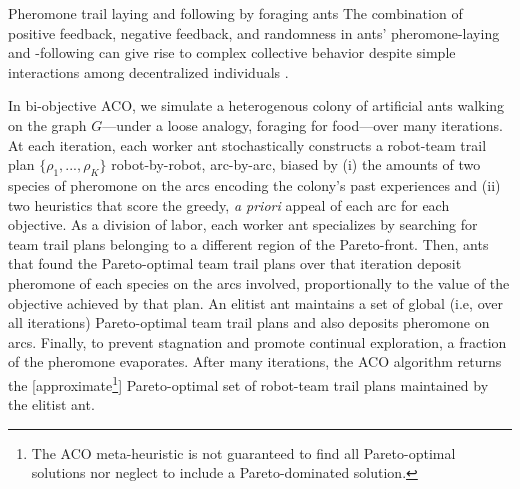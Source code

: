 \documentclass[11pt, oneside]{article}
\begin{document}
\begin{mybox}[label=box:ants, breakable]{Pheromone trail laying and following by foraging ants}
The combination of positive feedback, negative feedback, and randomness in ants' pheromone-laying and -following can give rise to complex collective behavior despite simple interactions among decentralized individuals \cite{bonabeau1997self,bonabeau1999swarm,goss1989self,jackson2006communication,edelstein1995trail,watmough1995modelling}.
\end{mybox}

In bi-objective ACO, we simulate a heterogenous colony of artificial ants walking on the graph $G$---under a loose analogy, foraging for food---over many iterations. 
At each iteration, each worker ant stochastically constructs a robot-team trail plan $\{\rho_1, ..., \rho_K\}$ robot-by-robot, arc-by-arc, biased by (i) the amounts of two species of pheromone on the arcs encoding the colony's past experiences and (ii) two heuristics that score the greedy, \emph{a priori} appeal of each arc for each objective. 
As a division of labor, each worker ant specializes by searching for team trail plans belonging to a different region of the Pareto-front.
Then, ants that found the Pareto-optimal team trail plans over that iteration deposit pheromone of each species on the arcs involved, proportionally to the value of the objective achieved by that plan.
An elitist ant \cite{dorigo1996ant} maintains a set of global (i.e, over all iterations) Pareto-optimal team trail plans and also deposits pheromone on arcs.
Finally, to prevent stagnation and promote continual exploration, a fraction of the pheromone evaporates. After many iterations, the ACO algorithm returns the [approximate\footnote{The ACO meta-heuristic is not guaranteed to find all Pareto-optimal solutions nor neglect to include a Pareto-dominated solution.}] Pareto-optimal set of robot-team trail plans maintained by the elitist ant. 
\end{document}
